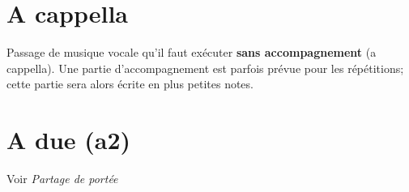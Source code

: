 \documentclass[11pt, twocolumn]{scrreprt}
\begin{document}
\newpage
{}
\fancyfoot[CO]{\thepage}%
\tableofcontents
\cleardoublepage
\clearpage
{}
\fancyfoot[CO]{\thepage}%


\section*{A cappella}
Passage de musique vocale qu'il faut exécuter \textbf{sans accompagnement} (a cappella). Une partie d'accompagnement est parfois prévue pour les répétitions; cette partie sera alors écrite en plus petites notes.



\section*{A due (a2)} Voir \emph{Partage de portée}
\end{document}
